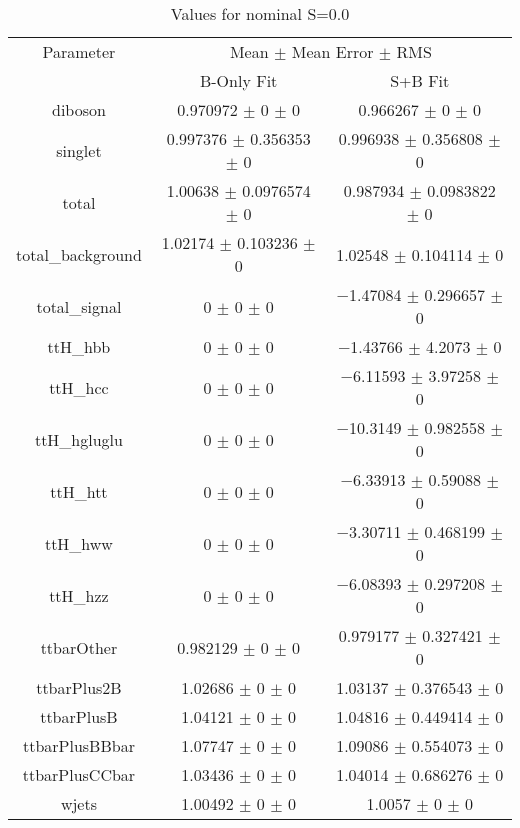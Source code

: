 \begin{table}
\centering
\caption{Values for nominal S=0.0}
\begin{tabular}{ccc}
\toprule
Parameter & \multicolumn{2}{c}{Mean $\pm$ Mean Error $\pm$ RMS}\\
 & B-Only Fit & S+B Fit\\
\midrule
diboson & \num{0.970972} $\pm$ \num{0} $\pm$ \num{0} & \num{0.966267} $\pm$ \num{0} $\pm$ \num{0}\\
singlet & \num{0.997376} $\pm$ \num{0.356353} $\pm$ \num{0} & \num{0.996938} $\pm$ \num{0.356808} $\pm$ \num{0}\\
total & \num{1.00638} $\pm$ \num{0.0976574} $\pm$ \num{0} & \num{0.987934} $\pm$ \num{0.0983822} $\pm$ \num{0}\\
total\_background & \num{1.02174} $\pm$ \num{0.103236} $\pm$ \num{0} & \num{1.02548} $\pm$ \num{0.104114} $\pm$ \num{0}\\
total\_signal & \num{0} $\pm$ \num{0} $\pm$ \num{0} & \num{-1.47084} $\pm$ \num{0.296657} $\pm$ \num{0}\\
ttH\_hbb & \num{0} $\pm$ \num{0} $\pm$ \num{0} & \num{-1.43766} $\pm$ \num{4.2073} $\pm$ \num{0}\\
ttH\_hcc & \num{0} $\pm$ \num{0} $\pm$ \num{0} & \num{-6.11593} $\pm$ \num{3.97258} $\pm$ \num{0}\\
ttH\_hgluglu & \num{0} $\pm$ \num{0} $\pm$ \num{0} & \num{-10.3149} $\pm$ \num{0.982558} $\pm$ \num{0}\\
ttH\_htt & \num{0} $\pm$ \num{0} $\pm$ \num{0} & \num{-6.33913} $\pm$ \num{0.59088} $\pm$ \num{0}\\
ttH\_hww & \num{0} $\pm$ \num{0} $\pm$ \num{0} & \num{-3.30711} $\pm$ \num{0.468199} $\pm$ \num{0}\\
ttH\_hzz & \num{0} $\pm$ \num{0} $\pm$ \num{0} & \num{-6.08393} $\pm$ \num{0.297208} $\pm$ \num{0}\\
ttbarOther & \num{0.982129} $\pm$ \num{0} $\pm$ \num{0} & \num{0.979177} $\pm$ \num{0.327421} $\pm$ \num{0}\\
ttbarPlus2B & \num{1.02686} $\pm$ \num{0} $\pm$ \num{0} & \num{1.03137} $\pm$ \num{0.376543} $\pm$ \num{0}\\
ttbarPlusB & \num{1.04121} $\pm$ \num{0} $\pm$ \num{0} & \num{1.04816} $\pm$ \num{0.449414} $\pm$ \num{0}\\
ttbarPlusBBbar & \num{1.07747} $\pm$ \num{0} $\pm$ \num{0} & \num{1.09086} $\pm$ \num{0.554073} $\pm$ \num{0}\\
ttbarPlusCCbar & \num{1.03436} $\pm$ \num{0} $\pm$ \num{0} & \num{1.04014} $\pm$ \num{0.686276} $\pm$ \num{0}\\
wjets & \num{1.00492} $\pm$ \num{0} $\pm$ \num{0} & \num{1.0057} $\pm$ \num{0} $\pm$ \num{0}\\
\bottomrule
\end{tabular}
\end{table}